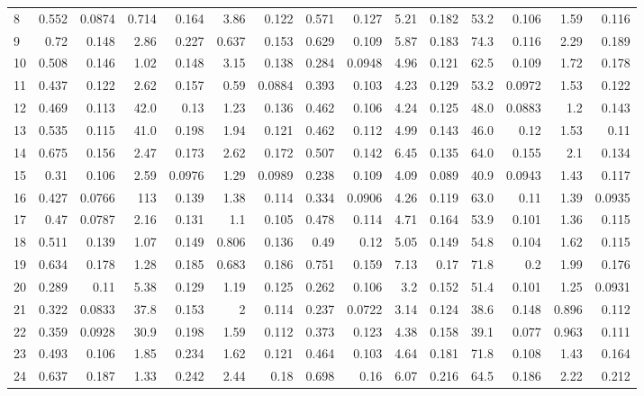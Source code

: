 \begin{longtable}{l rr rr rr rr rr rr rr}
8 & 0.552 & {0.0874} & 0.714 & {0.164} & 3.86 & {0.122} & 0.571 & {0.127} & 5.21 & {0.182} & 53.2 & {0.106} & 1.59 & {0.116}\\
9 & 0.72 & {0.148} & 2.86 & {0.227} & 0.637 & {0.153} & 0.629 & {0.109} & 5.87 & {0.183} & 74.3 & {0.116} & 2.29 & {0.189}\\
10 & 0.508 & {0.146} & 1.02 & {0.148} & 3.15 & {0.138} & 0.284 & {0.0948} & 4.96 & {0.121} & 62.5 & {0.109} & 1.72 & {0.178}\\
11 & 0.437 & {0.122} & 2.62 & {0.157} & 0.59 & {0.0884} & 0.393 & {0.103} & 4.23 & {0.129} & 53.2 & {0.0972} & 1.53 & {0.122}\\
12 & 0.469 & {0.113} & 42.0 & {0.13} & 1.23 & {0.136} & 0.462 & {0.106} & 4.24 & {0.125} & 48.0 & {0.0883} & 1.2 & {0.143}\\
13 & 0.535 & {0.115} & 41.0 & {0.198} & 1.94 & {0.121} & 0.462 & {0.112} & 4.99 & {0.143} & 46.0 & {0.12} & 1.53 & {0.11}\\
14 & 0.675 & {0.156} & 2.47 & {0.173} & 2.62 & {0.172} & 0.507 & {0.142} & 6.45 & {0.135} & 64.0 & {0.155} & 2.1 & {0.134}\\
15 & 0.31 & {0.106} & 2.59 & {0.0976} & 1.29 & {0.0989} & 0.238 & {0.109} & 4.09 & {0.089} & 40.9 & {0.0943} & 1.43 & {0.117}\\
16 & 0.427 & {0.0766} & 113 & {0.139} & 1.38 & {0.114} & 0.334 & {0.0906} & 4.26 & {0.119} & 63.0 & {0.11} & 1.39 & {0.0935}\\
17 & 0.47 & {0.0787} & 2.16 & {0.131} & 1.1 & {0.105} & 0.478 & {0.114} & 4.71 & {0.164} & 53.9 & {0.101} & 1.36 & {0.115}\\
18 & 0.511 & {0.139} & 1.07 & {0.149} & 0.806 & {0.136} & 0.49 & {0.12} & 5.05 & {0.149} & 54.8 & {0.104} & 1.62 & {0.115}\\
19 & 0.634 & {0.178} & 1.28 & {0.185} & 0.683 & {0.186} & 0.751 & {0.159} & 7.13 & {0.17} & 71.8 & {0.2} & 1.99 & {0.176}\\
20 & 0.289 & {0.11} & 5.38 & {0.129} & 1.19 & {0.125} & 0.262 & {0.106} & 3.2 & {0.152} & 51.4 & {0.101} & 1.25 & {0.0931}\\
21 & 0.322 & {0.0833} & 37.8 & {0.153} & 2 & {0.114} & 0.237 & {0.0722} & 3.14 & {0.124} & 38.6 & {0.148} & 0.896 & {0.112}\\
22 & 0.359 & {0.0928} & 30.9 & {0.198} & 1.59 & {0.112} & 0.373 & {0.123} & 4.38 & {0.158} & 39.1 & {0.077} & 0.963 & {0.111}\\
23 & 0.493 & {0.106} & 1.85 & {0.234} & 1.62 & {0.121} & 0.464 & {0.103} & 4.64 & {0.181} & 71.8 & {0.108} & 1.43 & {0.164}\\
24 & 0.637 & {0.187} & 1.33 & {0.242} & 2.44 & {0.18} & 0.698 & {0.16} & 6.07 & {0.216} & 64.5 & {0.186} & 2.22 & {0.212}\\
\end{longtable}
